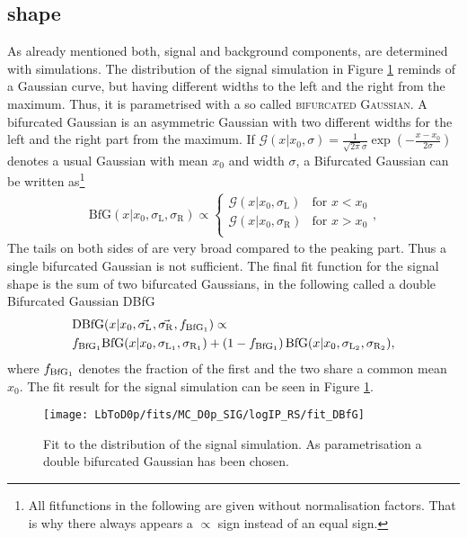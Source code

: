\subsection{\logIP shape}
As already mentioned both, \logIP signal and background components, are determined with simulations.
The \logIP distribution of the signal simulation in Figure \ref{fig:fit_logIP_signal} reminds of a Gaussian curve, but having different widths to the left and the right from the maximum.
Thus, it is parametrised with a so called \textsc{bifurcated Gaussian}.
A bifurcated Gaussian is an asymmetric Gaussian with two different widths for the left and the right part from the maximum.
If $\mathcal{G}(x|x_0,\sigma) = \frac{1}{\sqrt{2\pi}\sigma}\exp\left(-\frac{x-x_0}{2\sigma}\right)$ denotes a usual Gaussian with mean $x_0$ and width $\sigma$, a Bifurcated Gaussian can be written as\footnote{All fitfunctions in the following are given without normalisation factors. That is why there always appears a $\propto$ sign instead of an equal sign.}
\begin{align}
    \text{BfG}(x|x_0, \sigma_{\text{L}}, \sigma_{\text{R}}) \propto 
    \begin{cases}
        \mathcal{G}(x|x_0,\sigma_{\text{L}}) & \text{for } x < x_0 \\   
        \mathcal{G}(x|x_0,\sigma_{\text{R}}) & \text{for } x > x_0 \\   
    \end{cases},
\end{align}
The tails on both sides of \logIP are very broad compared to the peaking part.
Thus a single bifurcated Gaussian is not sufficient.
The final fit function for the signal \logIP shape is the sum of two bifurcated Gaussians, in the following called a double Bifurcated Gaussian DBfG
\begin{align}
    &\text{DBfG}(x|x_0,\vec{\sigma_{\text{L}_{}}}, \vec{\sigma_{\text{R}_{}}}, f_{\text{BfG}_1}) \propto \nonumber \\
    &f_{\text{BfG}_1} \text{BfG}(x|x_0,\sigma_{\text{L}_{1}}, \sigma_{\text{R}_{1}}) + \left(1 - f_{\text{BfG}_1} \right) \text{BfG}(x|x_0,\sigma_{\text{L}_{2}}, \sigma_{\text{R}_{2}}),
\end{align}
where $f_{\text{BfG}_1}$ denotes the fraction of the first \BfG and the two \BfG share a common mean $x_0$. 
The fit result for the signal simulation can be seen in Figure \ref{fig:fit_logIP_signal}.
\begin{figure}[tb]
    \centering
	\texttt{[image: LbToD0p/fits/MC\_D0p\_SIG/logIP\_RS/fit\_DBfG]}
	\caption{Fit to the \logIP distribution of the signal simulation. As parametrisation a double bifurcated Gaussian has been chosen.}
    \label{fig:fit_logIP_signal}
\end{figure}
